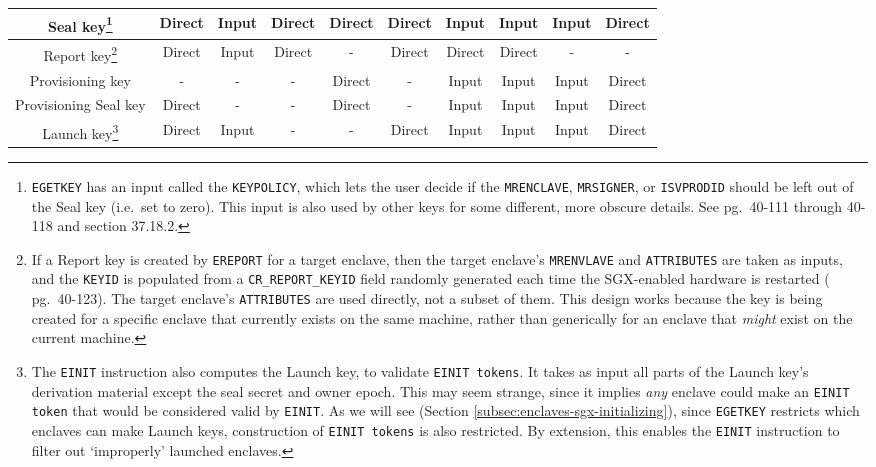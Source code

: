 \begin{tabularx}{1pt}{|c|c|c|c|c|c|c|c|c|c|}
\hline\hline
    Seal key\footnote{\label{footnote:sgx-seal-key-keypolicy}{\tt EGETKEY} has an input called the {\tt KEYPOLICY}, which lets the user decide if the {\tt MRENCLAVE}, {\tt MRSIGNER}, or {\tt ISVPRODID} should be left out of the Seal key (i.e.\ set to zero). This input is also used by other keys for some different, more obscure details. See \cite{sgx-manual} pg.\ 40-111 through 40-118 and section 37.18.2.} &
    Direct &
    Input &
    Direct &
    Direct &
    Direct &
    Input &
    Input &
    Input &
    Direct \\
\hline
    Report key\footnote{If a Report key is created by {\tt EREPORT} for a target enclave, then the target enclave's {\tt MRENVLAVE} and {\tt ATTRIBUTES} are taken as inputs, and the {\tt KEYID} is populated from a {\tt CR\_REPORT\_KEYID} field randomly generated each time the SGX-enabled hardware is restarted (\cite{sgx-manual} pg.\ 40-123). The target enclave's {\tt ATTRIBUTES} are used directly, not a subset of them. This design works because the key is being created for a specific enclave that currently exists on the same machine, rather than generically for an enclave that {\em might} exist on the current machine.} &
    Direct &
    Input &
    Direct &
    - &
    Direct &
    Direct &
    Direct &
    - &
    - \\
\hline
    Provisioning key &
    - &
    - &
    - &
    Direct &
    - &
    Input &
    Input &
    Input &
    Direct \\
\hline
    Provisioning Seal key &
    Direct &
    - &
    - &
    Direct &
    - &
    Input &
    Input &
    Input &
    Direct \\
\hline
    Launch key\footnote{The {\tt EINIT} instruction also computes the Launch key, to validate {\tt EINIT tokens}. It takes as input all parts of the Launch key's derivation material except the seal secret and owner epoch. This may seem strange, since it implies {\em any} enclave could make an {\tt EINIT token} that would be considered valid by {\tt EINIT}. As we will see (Section \ref{subsec:enclaves-sgx-initializing}), since {\tt EGETKEY} restricts which enclaves can make Launch keys, construction of {\tt EINIT tokens} is also restricted. By extension, this enables the {\tt EINIT} instruction to filter out `improperly' launched enclaves.} &
    Direct &
    Input &
    - &
    - &
    Direct &
    Input &
    Input &
    Input &
    Direct \\
\hline
\end{tabularx}

